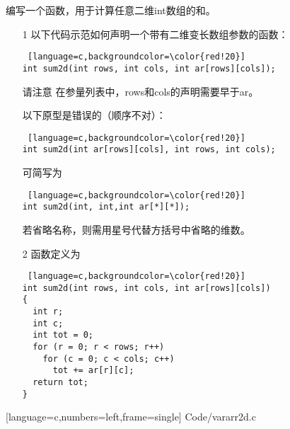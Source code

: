 \begin{frame}[fragile]\ft{\secname}
编写一个函数，用于计算任意二维int数组的和。
\end{frame}

\begin{frame}[fragile]\ft{\secname}
\begin{enumerate}
\item[1] 以下代码示范如何声明一个带有二维变长数组参数的函数：
\begin{lstlisting} [language=c,backgroundcolor=\color{red!20}]
int sum2d(int rows, int cols, int ar[rows][cols]);
\end{lstlisting}
请注意
在参量列表中，{\tf rows}和{\tf cols}的声明需要早于{\tf ar}。\\[0.1in]

\item[] 以下原型是错误的（顺序不对）：
\begin{lstlisting} [language=c,backgroundcolor=\color{red!20}]
int sum2d(int ar[rows][cols], int rows, int cols);
\end{lstlisting}\vspace{0.05in}

\item[] 可简写为
\begin{lstlisting} [language=c,backgroundcolor=\color{red!20}]
int sum2d(int, int,int ar[*][*]);
\end{lstlisting}
若省略名称，则需用星号代替方括号中省略的维数。
\end{enumerate}
\end{frame}

\begin{frame}[fragile]\ft{\secname}
\begin{enumerate}
\item[2] 函数定义为
\begin{lstlisting} [language=c,backgroundcolor=\color{red!20}]
int sum2d(int rows, int cols, int ar[rows][cols])
{
  int r;
  int c;
  int tot = 0;
  for (r = 0; r < rows; r++)
    for (c = 0; c < cols; c++)
      tot += ar[r][c];
  return tot;
}
\end{lstlisting}
\end{enumerate}
\end{frame}

\begin{frame}\ft{\secname}

[language=c,numbers=left,frame=single]
{Code/vararr2d.c}
\end{frame}


